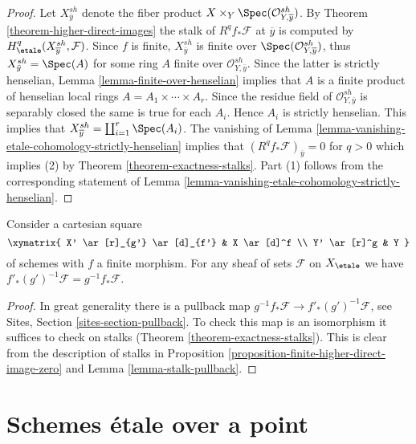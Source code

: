 \begin{proof}
Let $X_{\overline{y}}^{sh}$ denote the fiber product
$X \times_Y \Spec(\mathcal{O}_{Y, \overline{y}}^{sh})$.
By Theorem \ref{theorem-higher-direct-images}
the stalk of $R^qf_*\mathcal{F}$ at $\overline{y}$ is computed by
$H_\etale^q(X_{\overline{y}}^{sh}, \mathcal{F})$.
Since $f$ is finite, $X_{\bar y}^{sh}$ is finite over
$\Spec(\mathcal{O}_{Y, \overline{y}}^{sh})$, thus
$X_{\bar y}^{sh} = \Spec(A)$ for some ring $A$
finite over $\mathcal{O}_{Y, \bar y}^{sh}$.
Since the latter is strictly henselian,
Lemma \ref{lemma-finite-over-henselian}
implies that $A$ is a finite product of henselian local rings
$A = A_1 \times \cdots \times A_r$. Since the residue field of
$\mathcal{O}_{Y, \overline{y}}^{sh}$ is separably closed the
same is true for each $A_i$. Hence $A_i$ is strictly henselian.
This implies that $X_{\overline{y}}^{sh} = \coprod_{i=1}^r \Spec(A_i)$.
The vanishing of
Lemma \ref{lemma-vanishing-etale-cohomology-strictly-henselian}
implies that $(R^qf_*\mathcal{F})_{\overline{y}} = 0$ for $q > 0$
which implies (2) by Theorem \ref{theorem-exactness-stalks}.
Part (1) follows from the corresponding statement of
Lemma \ref{lemma-vanishing-etale-cohomology-strictly-henselian}.
\end{proof}

\begin{lemma}
\label{lemma-finite-pushforward-commutes-with-base-change}
Consider a cartesian square
$$
\xymatrix{
X' \ar[r]_{g'} \ar[d]_{f'} & X \ar[d]^f \\
Y' \ar[r]^g & Y
}
$$
of schemes with $f$ a finite morphism. For any sheaf of sets
$\mathcal{F}$ on $X_\etale$ we have
$f'_*(g')^{-1}\mathcal{F} = g^{-1}f_*\mathcal{F}$.
\end{lemma}

\begin{proof}
In great generality there is a pullback map
$g^{-1}f_*\mathcal{F} \to f'_*(g')^{-1}\mathcal{F}$, see
Sites, Section \ref{sites-section-pullback}.
To check this map is an isomorphism it suffices to check
on stalks (Theorem \ref{theorem-exactness-stalks}).
This is clear from the description of stalks
in Proposition \ref{proposition-finite-higher-direct-image-zero} and
Lemma \ref{lemma-stalk-pullback}.
\end{proof}





\section{Schemes \'etale over a point}
\label{section-schemes-etale-point}

